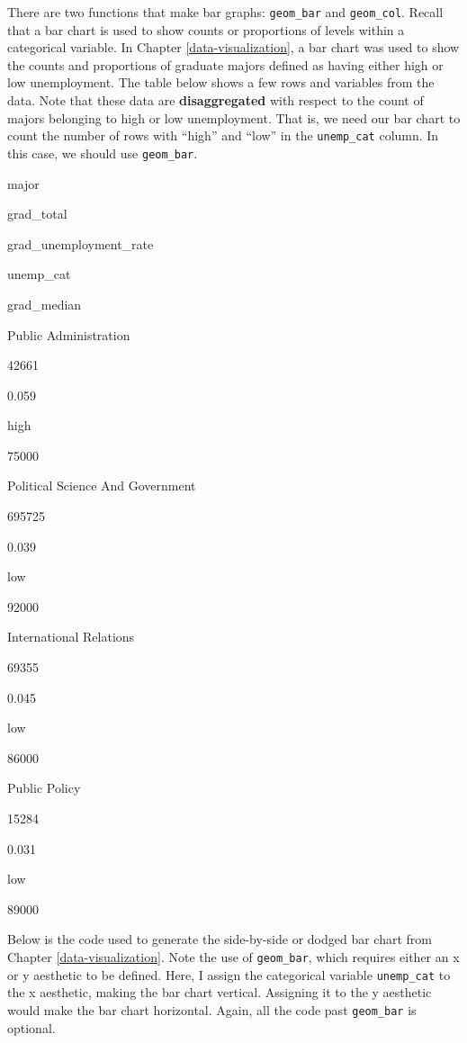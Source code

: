 \documentclass[
]{book}
\begin{document}
There are two functions that make bar graphs: \texttt{geom\_bar} and \texttt{geom\_col}. Recall that a bar chart is used to show counts or proportions of levels within a categorical variable. In Chapter \ref{data-visualization}, a bar chart was used to show the counts and proportions of graduate majors defined as having either high or low unemployment. The table below shows a few rows and variables from the data. Note that these data are \textbf{disaggregated} with respect to the count of majors belonging to high or low unemployment. That is, we need our bar chart to count the number of rows with ``high'' and ``low'' in the \texttt{unemp\_cat} column. In this case, we should use \texttt{geom\_bar}.

major

grad\_total

grad\_unemployment\_rate

unemp\_cat

grad\_median

Public Administration

42661

0.059

high

75000

Political Science And Government

695725

0.039

low

92000

International Relations

69355

0.045

low

86000

Public Policy

15284

0.031

low

89000

Below is the code used to generate the side-by-side or dodged bar chart from Chapter \ref{data-visualization}. Note the use of \texttt{geom\_bar}, which requires either an x or y aesthetic to be defined. Here, I assign the categorical variable \texttt{unemp\_cat} to the x aesthetic, making the bar chart vertical. Assigning it to the y aesthetic would make the bar chart horizontal. Again, all the code past \texttt{geom\_bar} is optional.
\end{document}
